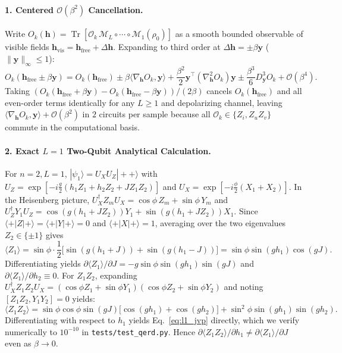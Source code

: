 \documentclass[11pt]{article}
\begin{document}
\paragraph{1. Centered $\mathcal{O}(\beta^2)$ Cancellation.}
Write $O_k(\mathbf{h}) = \operatorname{Tr}[\mathcal{O}_k\,\mathcal{M}_L\circ\cdots\circ\mathcal{M}_1(\rho_0)]$ as a smooth bounded observable of visible fields $\mathbf{h}_{\text{vis}} = \mathbf{h}_{\text{free}} + \Delta\mathbf{h}$. Expanding to third order at $\Delta\mathbf{h}=\pm\beta\mathbf{y}$ ($\|\mathbf{y}\|_\infty \le 1$):
\begin{equation}
  O_k(\mathbf{h}_{\text{free}}\pm\beta\mathbf{y}) = O_k(\mathbf{h}_{\text{free}}) \pm \beta\langle\nabla_{\mathbf{h}} O_k, \mathbf{y}\rangle + \frac{\beta^2}{2}\mathbf{y}^\top(\nabla_{\mathbf{h}}^2 O_k)\mathbf{y} \pm \frac{\beta^3}{6} D_{\mathbf{y}}^3 O_k + \mathcal{O}(\beta^4).
\end{equation}
Taking $(O_k(\mathbf{h}_{\text{free}}{+}\beta\mathbf{y}) - O_k(\mathbf{h}_{\text{free}}{-}\beta\mathbf{y}))/(2\beta)$ cancels $O_k(\mathbf{h}_{\text{free}})$ and all even-order terms identically for any $L\ge 1$ and depolarizing channel, leaving $\langle\nabla_{\mathbf{h}} O_k, \mathbf{y}\rangle + \mathcal{O}(\beta^2)$ in $2$ circuits per sample because all $\mathcal{O}_k\in\{Z_i, Z_u Z_v\}$ commute in the computational basis.

\paragraph{2. Exact $L{=}1$ Two-Qubit Analytical Calculation.}
For $n{=}2, L{=}1$, $|\psi_1\rangle = U_X U_Z |++\rangle$ with $U_Z = \exp[-i\frac{g}{2}(h_1 Z_1 + h_2 Z_2 + J Z_1 Z_2)]$ and $U_X = \exp[-i\frac{\phi}{2}(X_1+X_2)]$. In the Heisenberg picture, $U_X^\dagger Z_m U_X = \cos\phi\, Z_m + \sin\phi\, Y_m$ and $U_Z^\dagger Y_1 U_Z = \cos(g(h_1+J Z_2)) Y_1 + \sin(g(h_1+J Z_2)) X_1$. Since $\langle +|Z|+\rangle=\langle +|Y|+\rangle=0$ and $\langle +|X|+\rangle=1$, averaging over the two eigenvalues $Z_2\in\{\pm 1\}$ gives
\begin{equation}
  \langle Z_1 \rangle = \sin\phi\cdot\frac{1}{2}\big[\sin(g(h_1+J)) + \sin(g(h_1-J))\big] = \sin\phi\sin(gh_1)\cos(gJ).
\end{equation}
Differentiating yields $\partial\langle Z_1\rangle/\partial J = -g\sin\phi\sin(gh_1)\sin(gJ)$ and $\partial\langle Z_1\rangle/\partial h_2 \equiv 0$. For $Z_1 Z_2$, expanding $U_X^\dagger Z_1 Z_2 U_X = (\cos\phi Z_1 + \sin\phi Y_1)(\cos\phi Z_2 + \sin\phi Y_2)$ and noting $[Z_1 Z_2, Y_1 Y_2]=0$ yields:
\begin{equation}
  \langle Z_1 Z_2\rangle = \sin\phi\cos\phi\sin(gJ)\big[\cos(gh_1)+\cos(gh_2)\big] + \sin^2\phi\sin(gh_1)\sin(gh_2).
\end{equation}
Differentiating with respect to $h_1$ yields Eq.~\eqref{eq:l1_jvp} directly, which we verify numerically to $10^{-10}$ in \nolinkurl{tests/test_qerd.py}. Hence $\partial\langle Z_1 Z_2\rangle/\partial h_1 \neq \partial\langle Z_1\rangle/\partial J$ even as $\beta\to 0$.
\end{document}

